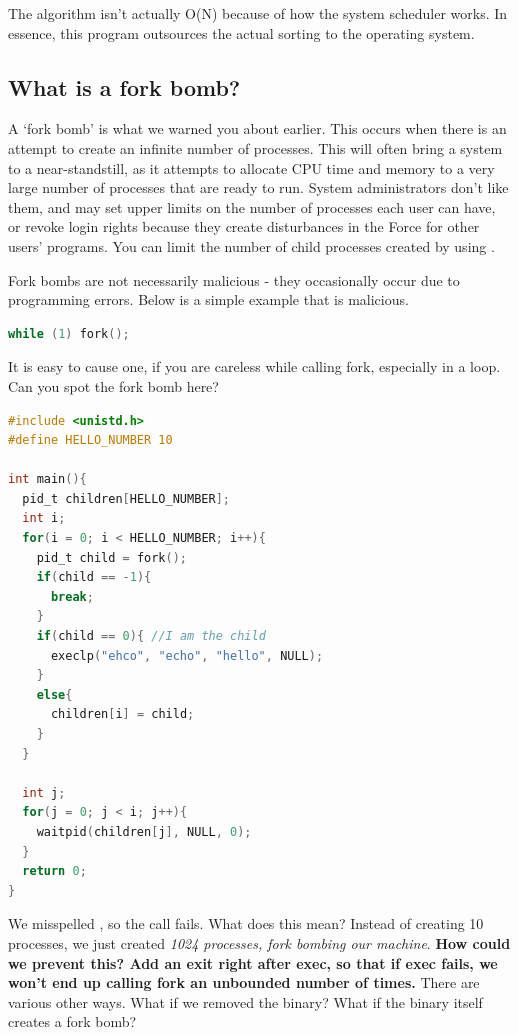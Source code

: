 The algorithm isn't actually O(N) because of how the system scheduler works.
In essence, this program outsources the actual sorting to the operating system.

\subsection{What is a fork bomb?}

A `fork bomb' is what we warned you about earlier.
This occurs when there is an attempt to create an infinite number of processes.
This will often bring a system to a near-standstill, as it attempts to allocate CPU time and memory to a very large number of processes that are ready to run.
System administrators don't like them, and may set upper limits on the number of processes each user can have, or revoke login rights because they create disturbances in the Force for other users' programs.
You can limit the number of child processes created by using .

Fork bombs are not necessarily malicious - they occasionally occur due to programming errors.
Below is a simple example that is malicious.

\begin{lstlisting}[language=C]
while (1) fork();
\end{lstlisting}

It is easy to cause one, if you are careless while calling fork, especially in a loop.
Can you spot the fork bomb here?

\begin{lstlisting}[language=C]
#include <unistd.h>
#define HELLO_NUMBER 10

int main(){
  pid_t children[HELLO_NUMBER];
  int i;
  for(i = 0; i < HELLO_NUMBER; i++){
    pid_t child = fork();
    if(child == -1){
      break;
    }
    if(child == 0){ //I am the child
      execlp("ehco", "echo", "hello", NULL);
    }
    else{
      children[i] = child;
    }
  }

  int j;
  for(j = 0; j < i; j++){
    waitpid(children[j], NULL, 0);
  }
  return 0;
}
\end{lstlisting}

We misspelled , so the  call fails.
What does this mean? Instead of creating 10 processes, we just created \emph{1024 processes, fork bombing our machine}. \textbf{How could we prevent this? Add an exit right after exec, so that if exec fails, we won't end up calling fork an unbounded number of times.}
There are various other ways. What if we removed the  binary? What if the binary itself creates a fork bomb?

